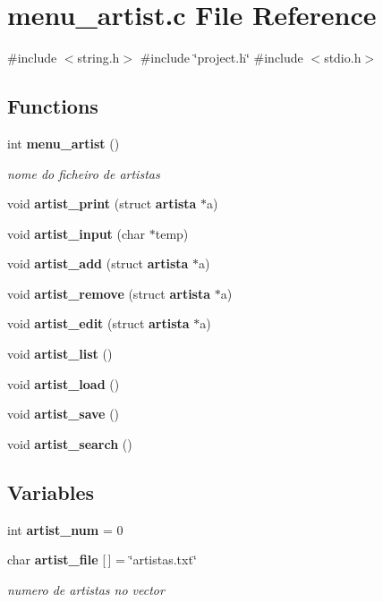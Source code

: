 \section{menu\+\_\+artist.\+c File Reference}
\label{menu__artist_8c}
{\ttfamily \#include $<$string.\+h$>$}\newline
{\ttfamily \#include \char`\"{}project.\+h\char`\"{}}\newline
{\ttfamily \#include $<$stdio.\+h$>$}\newline
\subsection*{Functions}
\begin{DoxyCompactItemize}
\item 
int \textbf{ menu\+\_\+artist} ()
\begin{DoxyCompactList}\small\item\em nome do ficheiro de artistas \end{DoxyCompactList}\item 
void \textbf{ artist\+\_\+print} (struct \textbf{ artista} $\ast$a)
\item 
void \textbf{ artist\+\_\+input} (char $\ast$temp)
\item 
void \textbf{ artist\+\_\+add} (struct \textbf{ artista} $\ast$a)
\item 
void \textbf{ artist\+\_\+remove} (struct \textbf{ artista} $\ast$a)
\item 
void \textbf{ artist\+\_\+edit} (struct \textbf{ artista} $\ast$a)
\item 
void \textbf{ artist\+\_\+list} ()
\item 
void \textbf{ artist\+\_\+load} ()
\item 
void \textbf{ artist\+\_\+save} ()
\item 
void \textbf{ artist\+\_\+search} ()
\end{DoxyCompactItemize}
\subsection*{Variables}
\begin{DoxyCompactItemize}
\item 
int \textbf{ artist\+\_\+num} = 0
\item 
char \textbf{ artist\+\_\+file} [$\,$] = \char`\"{}artistas.\+txt\char`\"{}
\begin{DoxyCompactList}\small\item\em numero de artistas no vector \end{DoxyCompactList}\end{DoxyCompactItemize}


